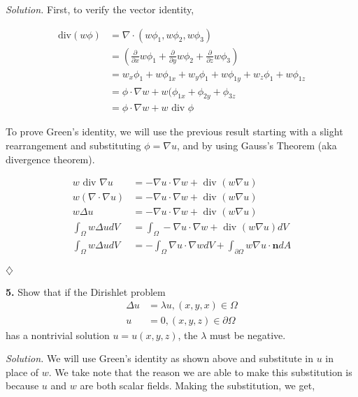\documentclass{article}
\begin{document}
\vspace{3mm}
\textit{Solution.} First, to verify the vector identity, 

\begin{align*}
\text{div}(w\phi) &= \nabla \cdot (w\phi_1, w\phi_2, w\phi_3)  \\
&= ( \frac{\partial}{\partial x }w\phi_1+\frac{\partial}{\partial y}w\phi_2+\frac{\partial}{\partial z} w\phi_3)\\
&= w_x\phi_1+ w\phi_{1x}+w_y\phi_1+ w\phi_{1y}+w_z\phi_1+ w\phi_{1z} \\
&=  \phi \cdot \nabla w + w( \phi_{1x} + \phi_{2y} +\phi_{3z} \\
&= \phi \cdot \nabla w + w \text{ div } \phi
\end{align*}

To prove Green's identity, we will use the previous result starting with a slight rearrangement and substituting \(\phi = \nabla u\), and by using Gauss's Theorem (aka divergence theorem).

\begin{align*}
w \text{ div } \nabla u &= - \nabla u \cdot \nabla w + \text{ div }( w \nabla u ) \\
w( \nabla \cdot \nabla u ) &=- \nabla u \cdot \nabla w + \text{ div }( w \nabla u )  \\
w \Delta u  &=- \nabla u \cdot \nabla w + \text{ div }( w \nabla u ) \\
\int_\Omega w \Delta u  dV &=\int_\Omega -\nabla u \cdot \nabla w + \text{ div }( w \nabla u ) dV\\ 
\int_\Omega w \Delta u  dV &=-\int_\Omega \nabla u \cdot \nabla w dV+ \int_{\partial \Omega}w\nabla u \cdot \textbf{n} dA
\end{align*}

\begin{flushright}
\( \diamondsuit \)
\end{flushright}

\vspace{3mm}
\textbf{5.} Show that if the Dirishlet problem 
\begin{align*}
\Delta u &= \lambda u,  (x,y,x) \in \Omega \\
u &= 0 , (x,y,z) \in \partial \Omega
\end{align*}
has a nontrivial solution \( u = u(x,y,z)\), the \(\lambda\) must be negative.

\vspace{3mm}
\textit{Solution.} We will use Green's identity as shown above and substitute in \(u\) in place of \(w\). We take note that the reason we are able to make this substitution is because \(u\) and \(w\) are both scalar fields. Making the substitution, we get,
\end{document}
